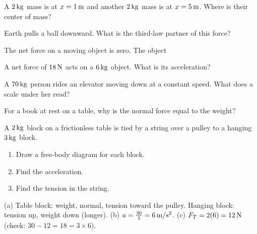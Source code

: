 \begin{exo}{}
A $2\,\mathrm{kg}$ mass is at $x=1\,\mathrm{m}$ and another $2\,\mathrm{kg}$ mass is at $x=5\,\mathrm{m}$. Where is their center of mass?
\end{exo}
\begin{exo}{}
Earth pulls a ball downward. What is the third-law partner of this force?
\end{exo}
\begin{exo}{}
The net force on a moving object is zero. The object
\end{exo}
\begin{exo}{}
A net force of $18\,\mathrm{N}$ acts on a $6\,\mathrm{kg}$ object. What is its acceleration?
\choices{$108\mss$}{$0.33\mss$}{$12\mss$}{$3\mss$}
\end{exo}
\begin{exo}{}
A $70\,\mathrm{kg}$ person rides an elevator moving down at a constant speed. What does a scale under her read?
\end{exo}
\begin{exo}{}
For a book at rest on a table, why is the normal force equal to the weight?
\end{exo}
\begin{exo}{}
A $2\,\mathrm{kg}$ block on a frictionless table is tied by a string over a pulley to a hanging $3\,\mathrm{kg}$ block.
\begin{enumerate}[label=(\alph*)]
\item Draw a free-body diagram for each block.
\item Find the acceleration.
\item Find the tension in the string.
\end{enumerate}
\work{4.5cm}
\begin{solution}
(a) Table block: weight, normal, tension toward the pulley. Hanging block: tension up, weight down (longer). \;(b) $a=\frac{30}{5}=6\,\mathrm{m/s^2}$. \;(c) $F_T=2(6)=12\,\mathrm{N}$ (check: $30-12=18=3\times6$).
\end{solution}
\end{exo}

